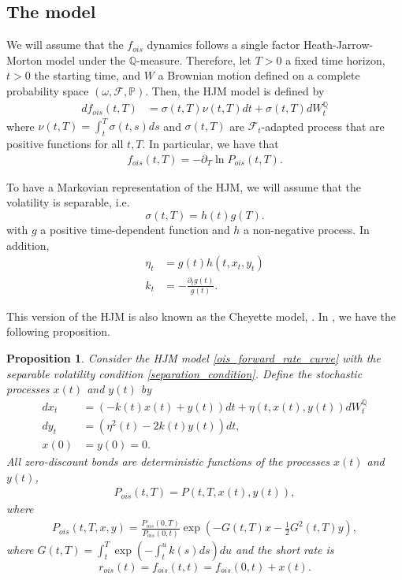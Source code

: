 \documentclass[a4paper,10pt]{article}
\newtheorem{proposition}[theorem]{Proposition}
\newcommand{\1}{\mathbf{1}}
\begin{document}
\subsection{The model}
We will assume that the $f_{ois}$ dynamics follows a single factor Heath-Jarrow-Morton model under the $\mathbb{Q}$-measure. Therefore, let $T>0$ a fixed time horizon, $t>0$ the starting time, and $W$ a Brownian motion defined on a complete probability space $(\omega, \mathcal{F}, \mathbb{P})$. Then, the HJM model is defined by
\begin{align}\label{ois_forward_rate_curve}
df_{ois}(t,T) &= \sigma(t,T)\nu(t,T)dt + \sigma(t,T)dW^{\mathbb{Q}}_t
\end{align}
where $\nu(t,T)=\int_{t}^{T}\sigma(t,s)ds$ and $\sigma(t, T)$ are $\mathcal{F}_{t}$-adapted process that are positive functions for all $t,T$. In particular, we have that
\begin{eqnarray*}
f_{ois}(t,T)= -\partial_{T}\ln P_{ois}(t,T).
\end{eqnarray*}

To have a Markovian representation of the HJM, we will assume that the volatility is separable, i.e.
\begin{equation}\label{separation_condition}
\sigma(t,T)= h(t)g(T).
\end{equation}
with $g$ a positive time-dependent function and $h$ a non-negative process. In addition,
\begin{align*}
\eta_t &= g(t)h(t,x_t,y_t)  \nonumber \\
k_t &= - \frac{\partial_t g(t)}{g(t)}.
\end{align*}

This version of the HJM is also known as the Cheyette model, \cite{Cheyette}. In \cite{AndreasenPiterbarg}, we have the following proposition.
\begin{proposition}
Consider the HJM model \eqref{ois_forward_rate_curve} with the separable volatility condition \eqref{separation_condition}. Define the stochastic processes $x(t)$ and $y(t)$ by
\begin{align}\label{short_rate_cheyette}
dx_t &= \left(-k(t) x(t) + y(t)\right)dt + \eta\left(t,x(t),y(t)\right) dW_t^{\mathbb{Q}} \nonumber \\
dy_t &= \left(\eta^{2}(t) - 2 k(t) y(t)\right) dt ,\nonumber \\
x(0) &=y(0)=0.
\end{align}
All zero-discount bonds are deterministic functions of the processes $x(t)$ and $y(t)$,
\begin{eqnarray*}
P_{ois}(t,T)=P(t, T, x(t), y(t)), 
\end{eqnarray*}
where 
\begin{eqnarray}\label{bond_ois}
P_{ois}(t,T,x,y) = \frac{P_{ois}(0,T)}{P_{ois}(0,t)} \exp\left(-G(t,T)x - \frac{1}{2} G^{2}(t,T)y \right),
\end{eqnarray}
where $G(t,T) = \int_{t}^{T} \exp\left(-\int_{t}^{u} k(s) ds \right) du$ and the short rate is
\begin{equation}
r_{ois}(t)=f_{ois}(t,t)= f_{ois}(0,t) + x(t).
\end{equation} 
\end{proposition}
\end{document}
